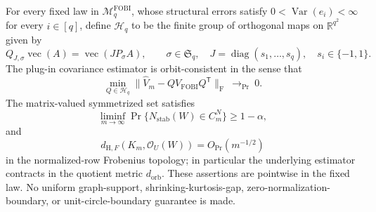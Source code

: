 For every fixed law in \(\mathcal M_q^{\mathrm{FOBI}}\), whose structural errors satisfy \(0<\operatorname{Var}(e_i)<\infty\) for every \(i\in[q]\), define \(\mathcal H_q\) to be the finite group of orthogonal maps on \(\mathbb R^{q^2}\) given by
\[
 Q_{J,\sigma}\operatorname{vec}(A)=\operatorname{vec}(J P_\sigma A),
 \qquad
 \sigma\in\mathfrak S_q,
 \quad
 J=\operatorname{diag}(s_1,\ldots,s_q),
 \quad s_i\in\{-1,1\}.
\]
The plug-in covariance estimator is orbit-consistent in the sense that
\[
 \min_{Q\in\mathcal H_q}
 \|\widehat V_m-QV_{\mathrm{FOBI}}Q^{\mathsf T}\|_{\mathrm F}
 \ \longrightarrow_{\Pr}\ 0.
\]
The matrix-valued symmetrized set satisfies
\[
 \liminf_{m\to\infty}
 \Pr\{N_{\mathrm{stab}}(W)\in C_m^N\}\geq1-\alpha,
\]
and
\[
 d_{\mathrm H,F}(K_m,\mathcal O_U(W))=O_{\Pr}(m^{-1/2})
\]
in the normalized-row Frobenius topology; in particular the underlying estimator contracts in the quotient metric \(d_{\mathrm{orb}}\). These assertions are pointwise in the fixed law. No uniform graph-support, shrinking-kurtosis-gap, zero-normalization-boundary, or unit-circle-boundary guarantee is made.

